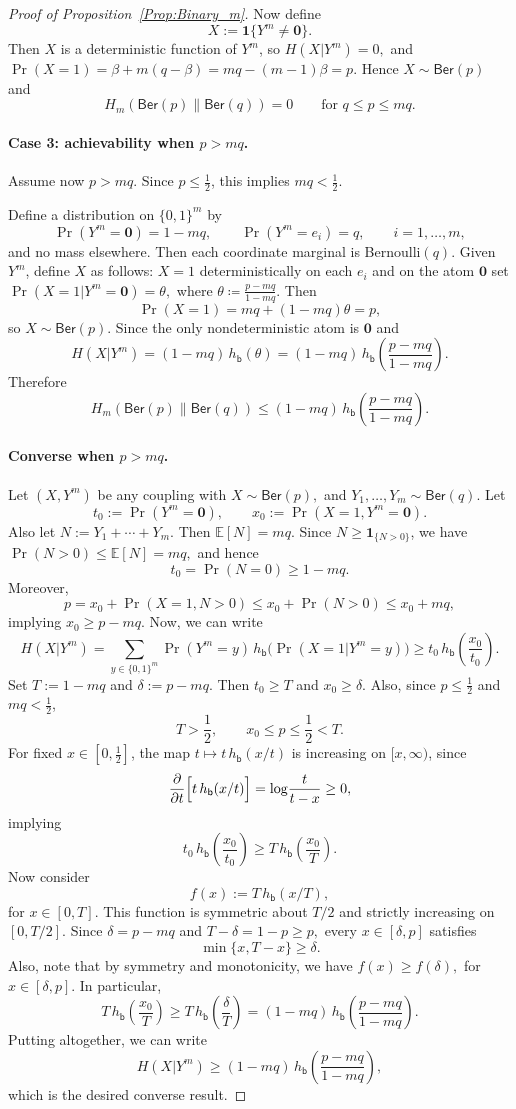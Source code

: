 \documentclass[10pt,a4paper]{amsart}
\newcommand{\Ber}{\mathsf{Ber}}
\begin{document}
\begin{proof}[Proof of Proposition~\ref{Prop:Binary_m}]
Now define
\[X:=\mathbf 1\{Y^m\neq \mathbf 0\}.\]
Then $X$ is a deterministic function of $Y^m$, so \(H(X| Y^m)=0,\)
and \(\Pr(X=1)=\beta+m(q-\beta)=mq-(m-1)\beta=p.\) Hence $X\sim\Ber(p)$ and
\[H_m(\Ber(p)\|\Ber(q))=0
\qquad\text{for }q\le p\le mq.\]

\paragraph{Case 3: achievability when $p>mq$.}
Assume now $p>mq$. Since $p\le \frac12$, this implies $mq<\frac12$.

Define a distribution on $\{0, 1\}^m$ by  \[\Pr(Y^m=\mathbf 0)=1-mq,\qquad \Pr(Y^m=e_i)=q,\qquad i=1,\dots,m,\]
and no mass elsewhere. Then each coordinate marginal is Bernoulli$(q)$.
Given $Y^m$, define $X$ as follows: \(X=1\) deterministically on each \(e_i\) and on the atom $\mathbf 0$ set \(\Pr(X=1| Y^m=\mathbf 0)=\theta,\)
where $\theta\coloneqq \frac{p-mq}{1-mq}.$ Then
\[\Pr(X=1)=mq+(1-mq)\theta=p,\]
so $X\sim\Ber(p)$. Since the only nondeterministic atom is $\mathbf 0$ and 
\[H(X| Y^m)=(1-mq)\,h_{\mathsf{b}}(\theta)=(1-mq)\,h_{\mathsf{b}}\!\left(\frac{p-mq}{1-mq}\right).\]
Therefore
\[H_m(\Ber(p)\|\Ber(q))\le(1-mq)\,h_{\mathsf{b}}\!\left(\frac{p-mq}{1-mq}\right).\]

\paragraph{Converse when $p>mq$.}
Let $(X,Y^m)$ be any coupling with \(X\sim\Ber(p),\) and  \(Y_1,\dots,Y_m\sim\Ber(q).\)
Let
\[t_0:=\Pr(Y^m=\mathbf 0),\qquad x_0:=\Pr(X=1,Y^m=\mathbf 0).\]
Also let \(N:=Y_1+\cdots+Y_m.\)
Then $\mathbb E[N]=mq.$ Since $N\ge \mathbf 1_{\{N>0\}}$, we have  \(\Pr(N>0)\le \mathbb E[N]=mq,\) and hence
\[t_0=\Pr(N=0)\ge 1-mq.\]
Moreover,
\[p=x_0+\Pr(X=1,N>0)\le x_0+\Pr(N>0)\le x_0+mq,\]
implying \(x_0\ge p-mq.\) Now, we can write 
\[H(X| Y^m)=\sum_{y\in\{0,1\}^m}\Pr(Y^m=y)\,
h_{\mathsf{b}}\!\bigl(\Pr(X=1| Y^m=y)\bigr)\ge t_0\,h_{\mathsf{b}}\!\left(\frac{x_0}{t_0}\right).\]
Set \(T:=1-mq\) and \(\delta:=p-mq.\)
Then $t_0\ge T$ and $x_0\ge \delta$. Also, since $p\le \frac12$ and $mq<\frac12$,
\[T> \frac12,\qquad x_0\le p\le \frac12<T.\]
For fixed $x\in[0,\frac12]$, the map \(t\mapsto t\,h_{\mathsf{b}}(x/t)\)
is increasing on $[x,\infty)$, since
\[\frac{\partial}{\partial t}\Bigl[t\,h_{\mathsf{b}}(x/t)\Bigr]=\log\!\frac{t}{t-x}\ge 0,\]
implying 
\[t_0\,h_{\mathsf{b}}\!\left(\frac{x_0}{t_0}\right)\ge
T\,h_{\mathsf{b}}\!\left(\frac{x_0}{T}\right).\]
Now consider
\[f(x):=T\,h_{\mathsf{b}}(x/T),\]
for $x\in[0,T]$. This function is symmetric about $T/2$ and strictly increasing on $[0,T/2]$. Since \(\delta=p-mq\) and \(T-\delta=1-p\ge p,\) every $x\in[\delta,p]$ satisfies \[\min\{x,T-x\}\ge \delta.\]
Also, note that by symmetry and monotonicity, we have
\(f(x)\ge f(\delta),\) for $x\in[\delta,p]$. In particular,
\[T\,h_{\mathsf{b}}\!\left(\frac{x_0}{T}\right)\ge T\,h_{\mathsf{b}}\!\left(\frac{\delta}{T}\right)=(1-mq)\,h_{\mathsf{b}}\!\left(\frac{p-mq}{1-mq}\right).\]
Putting altogether, we can write
\[H(X| Y^m)\ge(1-mq)\,h_{\mathsf{b}}\!\left(\frac{p-mq}{1-mq}\right),\]
which is the desired converse result. 


\end{proof}
\end{document}
